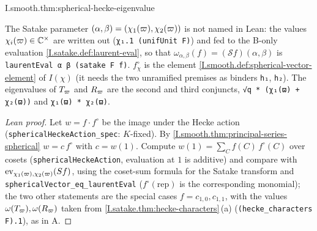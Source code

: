 \begin{tfformal}{I.smooth.thm:spherical-hecke-eigenvalue}
\begin{tffidelity}
The Satake parameter $(\alpha,\beta)=(\chi_1(\varpi),\chi_2(\varpi))$ is not named in Lean: the values $\chi_i(\varpi)\in\mathbb{C}^\times$ are written out (\texttt{χ₁.1 (unifUnit F)}) and fed to the B-only evaluation \cref{I.satake.def:laurent-eval}, so that $\omega_{\alpha,\beta}(f)=(\mathcal Sf)(\alpha,\beta)$ is \texttt{laurentEval α β (satake F f)}. $f^\circ_\chi$ is the element \cref{I.smooth.def:spherical-vector-element} of $I(\chi)$ (it needs the two unramified premises as binders \texttt{h₁}, \texttt{h₂}). The eigenvalues of $T_\varpi$ and $R_\varpi$ are the second and third conjuncts, \texttt{√q * (χ₁(ϖ) + χ₂(ϖ))} and \texttt{χ₁(ϖ) * χ₂(ϖ)}.
\end{tffidelity}
\end{tfformal}
\begin{proof}[Lean proof]
Let $w=f\cdot f^\circ$ be the image under the Hecke action (\texttt{sphericalHeckeAction\_spec}: $K$-fixed). By \cref{I.smooth.thm:principal-series-spherical} $w=c\,f^\circ$ with $c=w(1)$. Compute $w(1)=\sum_C f(C)\,f^\circ(C)$ over cosets (\texttt{sphericalHeckeAction}, evaluation at $1$ is additive) and compare with $\mathrm{ev}_{\chi_1(\varpi),\chi_2(\varpi)}(S f)$, using the coset-sum formula for the Satake transform and \texttt{sphericalVector\_eq\_laurentEval} ($f^\circ(\mathrm{rep})$ is the corresponding monomial); the two other statements are the special cases $f=c_{1,0},c_{1,1}$, with the values $\omega(T_\varpi),\omega(R_\varpi)$ taken from \cref{I.satake.thm:hecke-characters}\,(a) (\texttt{(hecke\_characters F).1}), as in A.
\end{proof}

